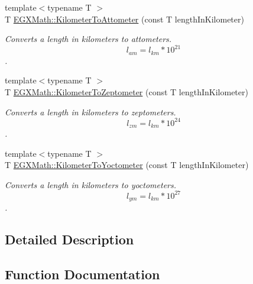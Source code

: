 \begin{DoxyCompactItemize}
{\footnotesize template$<$typename T $>$ }\\T \mbox{\hyperlink{group___e_g_x_math-_conversions-_length_conversions-_s_i-_kilometer-_s_i_ga73569efb1cfc6e4972fe1cde86f221bd}{E\+G\+X\+Math\+::\+Kilometer\+To\+Attometer}} (const T length\+In\+Kilometer)
\begin{DoxyCompactList}\small\item\em Converts a length in kilometers to attometers. \[ l_{am}=l_{km} * 10^{21} \]. \end{DoxyCompactList}\item 
{\footnotesize template$<$typename T $>$ }\\T \mbox{\hyperlink{group___e_g_x_math-_conversions-_length_conversions-_s_i-_kilometer-_s_i_ga377d2c4ad2db833c5a7c16861600da49}{E\+G\+X\+Math\+::\+Kilometer\+To\+Zeptometer}} (const T length\+In\+Kilometer)
\begin{DoxyCompactList}\small\item\em Converts a length in kilometers to zeptometers. \[ l_{zm}=l_{km} * 10^{24} \]. \end{DoxyCompactList}\item 
{\footnotesize template$<$typename T $>$ }\\T \mbox{\hyperlink{group___e_g_x_math-_conversions-_length_conversions-_s_i-_kilometer-_s_i_gaf03c100edda155de40290d8c3e155a27}{E\+G\+X\+Math\+::\+Kilometer\+To\+Yoctometer}} (const T length\+In\+Kilometer)
\begin{DoxyCompactList}\small\item\em Converts a length in kilometers to yoctometers. \[ l_{ym}=l_{km} * 10^{27} \]. \end{DoxyCompactList}\end{DoxyCompactItemize}


\subsection{Detailed Description}


\subsection{Function Documentation}
\mbox{\label{group___e_g_x_math-_conversions-_length_conversions-_s_i-_kilometer-_s_i_ga73569efb1cfc6e4972fe1cde86f221bd}} 
